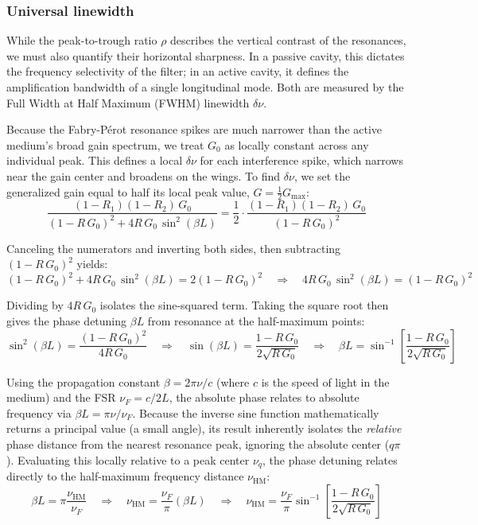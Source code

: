 \subsubsection{Universal linewidth}

While the peak-to-trough ratio $\rho$ describes the vertical contrast of the resonances, we must also quantify their horizontal sharpness. In a passive cavity, this dictates the frequency selectivity of the filter; in an active cavity, it defines the amplification bandwidth of a single longitudinal mode. Both are measured by the Full Width at Half Maximum (FWHM) linewidth $\delta\nu$.

Because the Fabry-Pérot resonance spikes are much narrower than the active medium's broad gain spectrum, we treat $G_0$ as locally constant across any individual peak. This defines a local $\delta\nu$ for each interference spike, which narrows near the gain center and broadens on the wings. To find $\delta\nu$, we set the generalized gain equal to half its local peak value, $G = \tfrac{1}{2}G_{\max}$:
\begin{equation*}
    \frac{(1-R_1)(1-R_2)\,G_0}{\left(1 - R\,G_0\right)^2 + 4R\,G_0\,\sin^2(\beta L)} = \frac{1}{2}\cdot\frac{(1-R_1)(1-R_2)\,G_0}{\left(1 - R\,G_0\right)^2}
\end{equation*}

Canceling the numerators and inverting both sides, then subtracting $(1 - R\,G_0)^2$ yields:
\begin{equation*}
    \left(1 - R\,G_0\right)^2 + 4R\,G_0\,\sin^2(\beta L) = 2\left(1 - R\,G_0\right)^2 \quad \Rightarrow \quad 4R\,G_0\,\sin^2(\beta L) = \left(1 - R\,G_0\right)^2
\end{equation*}

Dividing by $4R\,G_0$ isolates the sine-squared term. Taking the square root then gives the phase detuning $\beta L$ from resonance at the half-maximum points:
\begin{equation*}
    \sin^2(\beta L) = \frac{(1 - R\,G_0)^2}{4R\,G_0} \quad \Rightarrow \quad \sin(\beta L) = \frac{1 - R\,G_0}{2\sqrt{R\,G_0}} \quad \Rightarrow \quad \beta L = \sin^{-1}\!\left[\frac{1 - R\,G_0}{2\sqrt{R\,G_0}}\right]
\end{equation*}

Using the propagation constant $\beta = 2\pi\nu / c$ (where $c$ is the speed of light in the medium) and the FSR $\nu_F = c / 2L$, the absolute phase relates to absolute frequency via $\beta L = \pi\nu/\nu_F$. Because the inverse sine function mathematically returns a principal value (a small angle), its result inherently isolates the \textit{relative} phase distance from the nearest resonance peak, ignoring the absolute center ($q\pi$). Evaluating this locally relative to a peak center $\nu_q$, the phase detuning relates directly to the half-maximum frequency distance $\nu_{\text{HM}}$:
\begin{equation*}
    \beta L = \pi \frac{\nu_{\text{HM}}}{\nu_F} \quad \Rightarrow \quad \nu_{\text{HM}} = \frac{\nu_F}{\pi}(\beta L) \quad \Rightarrow \quad \nu_{\text{HM}} = \frac{\nu_F}{\pi} \sin^{-1}\!\left[\frac{1 - R\,G_0}{2\sqrt{R\,G_0}}\right]
\end{equation*}

